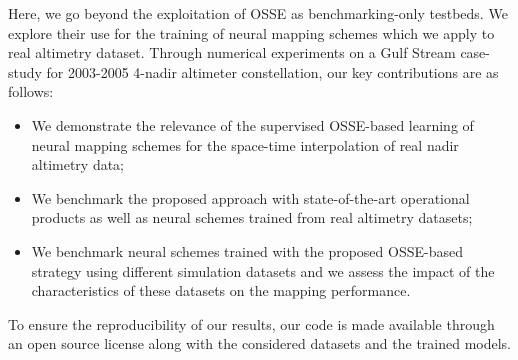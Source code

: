 \documentclass[draft]{agujournal2019}
\begin{document}
Here, we go beyond the exploitation of OSSE as benchmarking-only testbeds. We explore their use for the training of neural mapping schemes which we apply to real altimetry dataset. Through numerical experiments on a Gulf Stream case-study for 2003-2005 4-nadir altimeter constellation, our key contributions are as follows:  
    \begin{itemize}
    \item{We demonstrate the relevance of the supervised OSSE-based learning of neural mapping schemes for the space-time interpolation of real nadir altimetry data;}
    \item{We benchmark the proposed approach with state-of-the-art operational products as well as neural schemes trained from real altimetry datasets;}    
    \item{We benchmark neural schemes trained with the proposed OSSE-based strategy using different simulation datasets and we assess the impact of the characteristics of these datasets on the mapping performance.}
    \end{itemize}
To ensure the reproducibility of our results, our code is made available through an open source license along with the considered datasets and the trained models.
\end{document}
